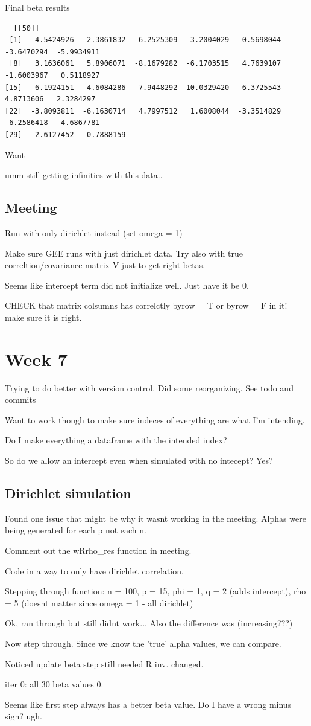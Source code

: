 \documentclass[10pt]{article}
\theoremstyle{definition}
\begin{document}
Final beta results
\begin{verbatim}
  [[50]]
 [1]   4.5424926  -2.3861832  -6.2525309   3.2004029   0.5698044  -3.6470294  -5.9934911
 [8]   3.1636061   5.8906071  -8.1679282  -6.1703515   4.7639107  -1.6003967   0.5118927
[15]  -6.1924151   4.6084286  -7.9448292 -10.0329420  -6.3725543   4.8713606   2.3284297
[22]  -3.8093811  -6.1630714   4.7997512   1.6008044  -3.3514829  -6.2586418   4.6867781
[29]  -2.6127452   0.7888159
\end{verbatim}

Want


umm still getting infinities with this data..



\subsection{Meeting}
Run with only dirichlet instead (set omega = 1)

Make sure GEE runs with just dirichlet data.
Try also with true correltion/covariance matrix V just to get right betas.

Seems like intercept term did not initialize well. Just have it be 0.

CHECK that matrix colsumns has correlctly byrow = T or byrow = F in it! make sure it is right.


\newpage

\section{Week 7}

Trying to do better with version control. Did some reorganizing. See todo and commits

Want to work though to make sure indeces of everything are what I'm intending.

Do I make everything a dataframe with the intended index?

So do we allow an intercept even when simulated with no intecept? Yes?



\subsection{Dirichlet simulation}
Found one issue that might be why it wasnt working in the meeting. Alphas were being generated for each p not each n.

Comment out the wRrho_res function in meeting.

Code in a way to only have dirichlet correlation.

Stepping through function:
n = 100, p = 15, phi = 1, q = 2 (adds intercept), rho = 5 (doesnt matter since omega = 1 - all dirichlet)


Ok, ran through but still didnt work... Also the difference was (increasing???)

Now step through. Since we know the 'true' alpha values, we can compare.

Noticed update beta step still needed R inv. changed.

iter 0: all 30 beta values 0.

Seems like first step always has a better beta value. Do I have a wrong minus sign? ugh.
\end{document}

